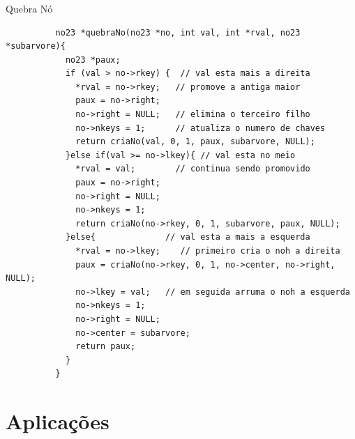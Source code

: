 \documentclass[cyan,compress,aspectratio=43]{beamer}
\begin{document}
\begin{frame}[fragile]
\frametitle{}
      \vspace{-0.2cm}
	\begin{block}{Quebra Nó}
		\begin{lstlisting}
		  no23 *quebraNo(no23 *no, int val, int *rval, no23 *subarvore){
		    no23 *paux;
		    if (val > no->rkey) {  // val esta mais a direita
		      *rval = no->rkey;   // promove a antiga maior
		      paux = no->right;
		      no->right = NULL;   // elimina o terceiro filho
		      no->nkeys = 1;      // atualiza o numero de chaves
		      return criaNo(val, 0, 1, paux, subarvore, NULL);
		    }else if(val >= no->lkey){ // val esta no meio
		      *rval = val;        // continua sendo promovido
		      paux = no->right;
		      no->right = NULL;
		      no->nkeys = 1;
		      return criaNo(no->rkey, 0, 1, subarvore, paux, NULL);
		    }else{              // val esta a mais a esquerda
		      *rval = no->lkey;    // primeiro cria o noh a direita
		      paux = criaNo(no->rkey, 0, 1, no->center, no->right, NULL);
		      no->lkey = val;   // em seguida arruma o noh a esquerda
		      no->nkeys = 1;
		      no->right = NULL;
		      no->center = subarvore;
		      return paux;
		    }
		  }
	  \end{lstlisting}

  	\end{block}
\end{frame}


%		



%
%
\section[\thesection]{Aplicações}

\end{document}
